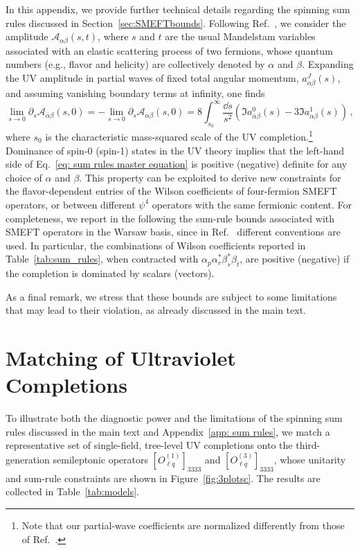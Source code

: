 \begin{subappendices}
In this appendix, we provide further technical details regarding the spinning sum rules discussed in Section~\ref{sec:SMEFTbounds}. 
Following Ref.~\cite{Remmen:2020uze}, we consider the amplitude $\mathcal{A}_{\alpha\beta}(s,t)$, where $s$ and $t$ are the usual Mandelstam variables associated with an elastic scattering process of
two fermions, whose quantum numbers (e.g., flavor and helicity) are collectively denoted by $\alpha$ and $\beta$.
Expanding the UV amplitude in partial waves of fixed total angular momentum, $a_{\alpha\beta}^{J}(s)$, and 
assuming vanishing boundary terms at infinity, one finds \cite{Remmen:2020uze}
%
\begin{equation}\label{eq: sum rules master equation}
    \lim_{s\rightarrow 0}\partial_s\mathcal{A}_{\overline \alpha\beta}(s,0) = -\lim_{s\rightarrow 0}\partial_s\mathcal{A}_{ \alpha\beta}(s,0) =8\int_{s_0}^\infty \dfrac{\dd s}{s^2}\left(\Im a_{\overline{\alpha}\beta}^{0}(s)-3\Im a_{\alpha\beta}^{1}(s)\right)\,,
\end{equation}
where $s_0$ is the characteristic mass-squared scale of the UV completion.\footnote{Note that our partial-wave coefficients are normalized differently from those of Ref.~\cite{Remmen:2020uze}.}
Dominance of spin-0 (spin-1) states in the UV theory implies that the left-hand side of Eq.~\eqref{eq: sum rules master equation} is positive (negative) definite for any choice of $\alpha$ and $\beta$.
This property can be exploited to derive new constraints for the flavor-dependent entries of the Wilson coefficients of four-fermion SMEFT operators, or between different $\psi^4$ operators with the same fermionic content. For completeness, we report in the following the sum-rule bounds associated with SMEFT operators in the Warsaw basis, since in Ref.~\cite{Remmen:2020uze} different conventions are used.
In particular, the combinations of Wilson coefficients reported in Table~\ref{tab:sum_rules}, when contracted with $\alpha_p \alpha_r^* \beta^*_s \beta_t$, are positive (negative) if the completion is dominated by scalars (vectors).
%

%
As a final remark, we stress that these bounds are subject to some limitations that may lead to their violation, as already discussed in the main text.

\section{Matching of Ultraviolet Completions}

To illustrate both the diagnostic power and the limitations of the spinning sum
rules discussed in the main text and Appendix~\ref{app: sum rules}, we match a
representative set of single-field, tree-level UV completions \cite{deBlas:2017xtg}
onto the third-generation semileptonic operators $[O_{\ell q}^{(1)}]_{3333}$ and
$[O_{\ell q}^{(3)}]_{3333}$, whose unitarity and sum-rule constraints are shown in
Figure~\ref{fig:3plotsc}. The results are collected in Table~\ref{tab:models}.
%



\end{subappendices}
